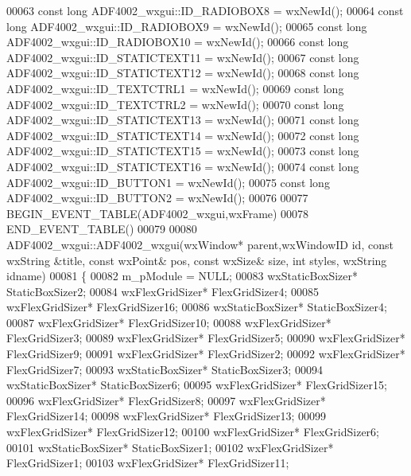 \begin{DoxyCode}
00063 \textcolor{keyword}{const} \textcolor{keywordtype}{long} ADF4002_wxgui::ID_RADIOBOX8 = wxNewId();
00064 \textcolor{keyword}{const} \textcolor{keywordtype}{long} ADF4002_wxgui::ID_RADIOBOX9 = wxNewId();
00065 \textcolor{keyword}{const} \textcolor{keywordtype}{long} ADF4002_wxgui::ID_RADIOBOX10 = wxNewId();
00066 \textcolor{keyword}{const} \textcolor{keywordtype}{long} ADF4002_wxgui::ID_STATICTEXT11 = wxNewId();
00067 \textcolor{keyword}{const} \textcolor{keywordtype}{long} ADF4002_wxgui::ID_STATICTEXT12 = wxNewId();
00068 \textcolor{keyword}{const} \textcolor{keywordtype}{long} ADF4002_wxgui::ID_TEXTCTRL1 = wxNewId();
00069 \textcolor{keyword}{const} \textcolor{keywordtype}{long} ADF4002_wxgui::ID_TEXTCTRL2 = wxNewId();
00070 \textcolor{keyword}{const} \textcolor{keywordtype}{long} ADF4002_wxgui::ID_STATICTEXT13 = wxNewId();
00071 \textcolor{keyword}{const} \textcolor{keywordtype}{long} ADF4002_wxgui::ID_STATICTEXT14 = wxNewId();
00072 \textcolor{keyword}{const} \textcolor{keywordtype}{long} ADF4002_wxgui::ID_STATICTEXT15 = wxNewId();
00073 \textcolor{keyword}{const} \textcolor{keywordtype}{long} ADF4002_wxgui::ID_STATICTEXT16 = wxNewId();
00074 \textcolor{keyword}{const} \textcolor{keywordtype}{long} ADF4002_wxgui::ID_BUTTON1 = wxNewId();
00075 \textcolor{keyword}{const} \textcolor{keywordtype}{long} ADF4002_wxgui::ID_BUTTON2 = wxNewId();
00076 
00077 BEGIN\_EVENT\_TABLE(ADF4002_wxgui,wxFrame)
00078 END\_EVENT\_TABLE()
00079 
00080 ADF4002_wxgui::ADF4002_wxgui(wxWindow* parent,wxWindowID \textcolor{keywordtype}{id}, const wxString &title, const wxPoint& pos,
      const wxSize& size, \textcolor{keywordtype}{int} styles, wxString idname)
00081 \{
00082     m\_pModule = NULL;
00083     wxStaticBoxSizer* StaticBoxSizer2;
00084     wxFlexGridSizer* FlexGridSizer4;
00085     wxFlexGridSizer* FlexGridSizer16;
00086     wxStaticBoxSizer* StaticBoxSizer4;
00087     wxFlexGridSizer* FlexGridSizer10;
00088     wxFlexGridSizer* FlexGridSizer3;
00089     wxFlexGridSizer* FlexGridSizer5;
00090     wxFlexGridSizer* FlexGridSizer9;
00091     wxFlexGridSizer* FlexGridSizer2;
00092     wxFlexGridSizer* FlexGridSizer7;
00093     wxStaticBoxSizer* StaticBoxSizer3;
00094     wxStaticBoxSizer* StaticBoxSizer6;
00095     wxFlexGridSizer* FlexGridSizer15;
00096     wxFlexGridSizer* FlexGridSizer8;
00097     wxFlexGridSizer* FlexGridSizer14;
00098     wxFlexGridSizer* FlexGridSizer13;
00099     wxFlexGridSizer* FlexGridSizer12;
00100     wxFlexGridSizer* FlexGridSizer6;
00101     wxStaticBoxSizer* StaticBoxSizer1;
00102     wxFlexGridSizer* FlexGridSizer1;
00103     wxFlexGridSizer* FlexGridSizer11;

\end{DoxyCode}
